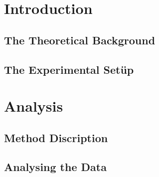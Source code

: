 \documentclass[a4paper,BCOR=15mm,bibliography=totoc]{scrbook}
\begin{document}
\frontmatter
  
  \tableofcontents

\mainmatter
  \chapter{Introduction}
  \blindtext
  \section{The Theoretical Background}
  \blindmathpaper
  \section{The Experimental Setüp}
  \blindmathpaper
  \chapter{Analysis}
  \blindtext
  \section{Method Discription}
  \blindmathpaper
  \section{Analysing the Data}
  \blindmathpaper

\backmatter
  \nocite{*}
  \printbibliography
\end{document}
